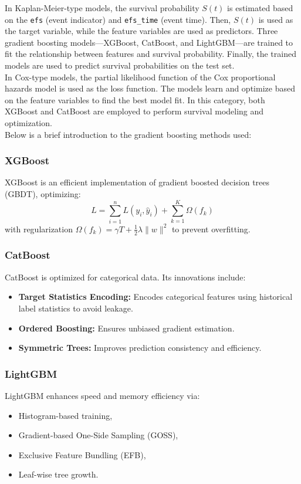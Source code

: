 \documentclass[11pt]{article}
\begin{document}
\noindent In Kaplan-Meier-type models, the survival probability $S(t)$ is estimated based on the \texttt{efs} (event indicator) and \texttt{efs\_time} (event time). Then, $S(t)$ is used as the target variable, while the feature variables are used as predictors. Three gradient boosting models—XGBoost, CatBoost, and LightGBM—are trained to fit the relationship between features and survival probability. Finally, the trained models are used to predict survival probabilities on the test set. \\

\noindent In Cox-type models, the partial likelihood function of the Cox proportional hazards model is used as the loss function. The models learn and optimize based on the feature variables to find the best model fit. In this category, both XGBoost and CatBoost are employed to perform survival modeling and optimization. \\

\noindent Below is a brief introduction to the gradient boosting methods used:


\subsubsection*{XGBoost}
XGBoost is an efficient implementation of gradient boosted decision trees (GBDT), optimizing:
\[
L = \sum_{i=1}^n L(y_i, \hat{y}_i) + \sum_{k=1}^K \Omega(f_k)
\]
with regularization $\Omega(f_k) = \gamma T + \frac{1}{2} \lambda \|w\|^2$ to prevent overfitting.

\subsubsection*{CatBoost}
CatBoost is optimized for categorical data. Its innovations include:
\begin{itemize}
  \item \textbf{Target Statistics Encoding:} Encodes categorical features using historical label statistics to avoid leakage.
  \item \textbf{Ordered Boosting:} Ensures unbiased gradient estimation.
  \item \textbf{Symmetric Trees:} Improves prediction consistency and efficiency.
\end{itemize}

\subsubsection*{LightGBM}
LightGBM enhances speed and memory efficiency via:
\begin{itemize}
  \item Histogram-based training,
  \item Gradient-based One-Side Sampling (GOSS),
  \item Exclusive Feature Bundling (EFB),
  \item Leaf-wise tree growth.
\end{itemize}
\end{document}
